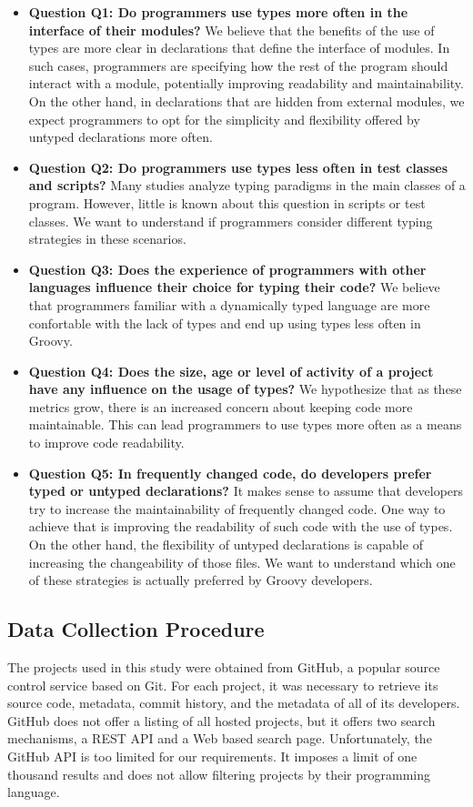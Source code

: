 \documentclass[]{sigplanconf}
\begin{document}
\begin{itemize}
	\item \textbf{Question Q1: Do programmers use types more often in the interface of their modules?} We believe that the benefits of the use of types are more clear in declarations that define the interface of modules. In such cases, programmers are specifying how the rest of the program should interact with a module, potentially improving readability and maintainability. On the other hand, in declarations that are hidden from external modules, we expect programmers to opt for the simplicity and flexibility offered by untyped declarations more often. 
	
	\item \textbf{Question Q2: Do programmers use types less often in test classes and scripts?} Many studies analyze typing paradigms in the main classes of a program. However, little is known about this question in scripts or test classes. We want to understand if programmers consider different typing strategies in these scenarios.

	\item \textbf{Question Q3: Does the experience of programmers with other languages influence their choice for typing their code?} We believe that programmers familiar with a dynamically typed language are more confortable with the lack of types and end up using types less often in Groovy. 

	\item \textbf{Question Q4: Does the size, age or level of activity of a project have any influence on the usage of types?} We hypothesize that as these metrics grow, there is an increased concern about keeping code more maintainable. This can lead programmers to use types more often as a means to improve code readability.

	\item \textbf{Question Q5: In frequently changed code, do developers prefer typed or untyped declarations?} It makes sense to assume that developers try to increase the maintainability of frequently changed code. One way to achieve that is improving the readability of such code with the use of types. On the other hand, the flexibility of untyped declarations is capable of increasing the changeability of those files. We want to understand which one of these strategies is actually preferred by Groovy developers.

\end{itemize}

\subsection{Data Collection Procedure\label{dataCollection}}
The projects used in this study were obtained from GitHub, a popular source control service based on Git.
For each project, it was necessary to retrieve its source code, metadata, commit history, and the metadata of all of its developers.
GitHub does not offer a listing of all hosted projects, but it offers two search mechanisms, a REST API and a Web based search page.
Unfortunately, the GitHub API is too limited for our requirements.
It imposes a limit of one thousand results and does not allow filtering projects by their programming language.
\end{document}
